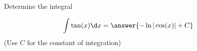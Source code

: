 \documentclass{ximera}
\author{Jason Miller}
\begin{document}
\begin{exercise}
Determine the integral

\[
\int \tan(x) \d x= \answer{ -\ln| \cos(x) | +C}
\]
(Use $C$ for the constant of integration)

\end{exercise}
\end{document}

